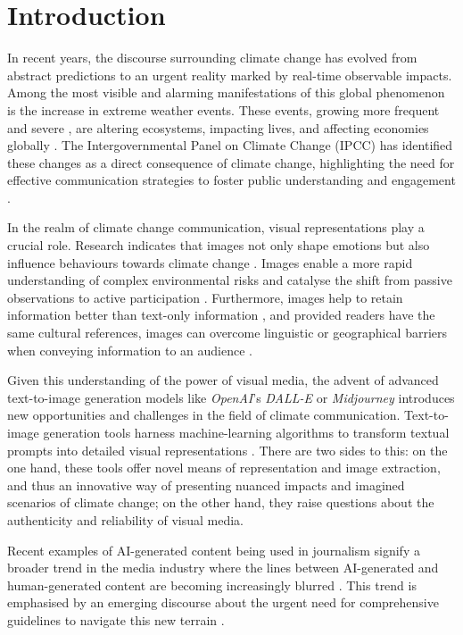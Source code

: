 \section{Introduction}

In recent years, the discourse surrounding climate change has evolved from abstract predictions to an urgent reality marked by real-time observable impacts. Among the most visible and alarming manifestations of this global phenomenon is the increase in extreme weather events. These events, growing more frequent and severe \parencite{ipcc2023_wg1_11}, are altering ecosystems, impacting lives, and affecting economies globally \parencite[2460]{ipcc2023_wg2_16}. The Intergovernmental Panel on Climate Change (IPCC) has identified these changes as a direct consequence of climate change, highlighting the need for effective communication strategies to foster public understanding and engagement \parencite{ipcc2023_wg1_1}.

In the realm of climate change communication, visual representations play a crucial role. Research indicates that images not only shape emotions but also influence behaviours towards climate change \parencite{Leiserowitz2006}. Images enable a more rapid understanding of complex environmental risks \parencite{Epstein1994, Joffe2008} and catalyse the shift from passive observations to active participation \parencite{Keib2018}. Furthermore, images help to retain information better than text-only information \parencite{Coleman2009, Graber1990}, and provided readers have the same cultural references, images can overcome linguistic or geographical barriers when conveying information to an audience \parencite{Armfield2013}.

Given this understanding of the power of visual media, the advent of advanced text-to-image generation models like \textit{OpenAI}’s \textit{DALL-E} or \textit{Midjourney} introduces new opportunities and challenges in the field of climate communication. Text-to-image generation tools harness machine-learning algorithms to transform textual prompts into detailed visual representations \parencite{Zhang2023}. There are two sides to this: on the one hand, these tools offer novel means of representation and image extraction, and thus an innovative way of presenting nuanced impacts and imagined scenarios of climate change; on the other hand, they raise questions about the authenticity and reliability of visual media.

Recent examples of AI-generated content being used in journalism signify a broader trend in the media industry where the lines between AI-generated and human-generated content are becoming increasingly blurred \parencite{Henrich2023, Kim2023}. This trend is emphasised by an emerging discourse about the urgent need for comprehensive guidelines to navigate this new terrain \parencite{CouncilOfEurope2023, SwissPressCouncil2023}. 


